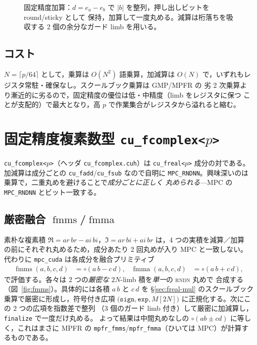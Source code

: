 \documentclass[uplatex,dvipdfmx,a4paper,11pt]{jsarticle}
\newcommand{\code}[1]{\texttt{#1}}
\newcommand{\PB}{\ensuremath{p}}
\newcommand{\Nlimb}{\ensuremath{N}}
\newcommand{\round}{\ensuremath{\circ}}
\newcommand{\rndn}{\textsc{rndn}}
\newcommand{\fmma}{\ensuremath{\operatorname{fmma}}}
\newcommand{\fmms}{\ensuremath{\operatorname{fmms}}}
\begin{document}
\begin{figure}[h]
\centering
{}
\caption{固定精度加算：$d=e_a-e_b$ で $|b|$ を整列，押し出しビットを round/sticky として
保持，加算して一度丸める。減算は桁落ちを吸収する 2 個の余分なガード limb を用いる。}
\label{fig:add}
\end{figure}

\subsection{コスト}
$\Nlimb=\lceil\PB/64\rceil$ として，乗算は $O(\Nlimb^2)$ 語乗算，加減算は
$O(\Nlimb)$ で，いずれもレジスタ常駐・確保なし。スクールブック乗算は GMP/MPFR の
劣 2 次乗算より漸近的に劣るので，固定精度の優位は低・中精度（limb をレジスタに保つ
ことが支配的）で最大となり，高 \PB{} で作業集合がレジスタから溢れると縮む。


\section{固定精度複素数型 \texorpdfstring{\code{cu\_fcomplex<\PB>}}{cu\_fcomplex<PB>}}
\label{sec:fcomplex}

\code{cu\_fcomplex<\PB>}（ヘッダ \code{cu\_fcomplex.cuh}）は \code{cu\_freal<\PB>}
成分の対である。加減算は成分ごとの \code{cu\_fadd}/\code{cu\_fsub} なので自明に
\code{MPC\_RNDNN}。興味深いのは乗算で，二重丸めを避けることで\emph{成分ごとに正しく
丸められる}---MPC の \code{MPC\_RNDNN} とビット一致する。

\subsection{厳密融合 \texorpdfstring{$\fmms$/$\fmma$}{fmms/fmma}}
\label{sec:fmms}

素朴な複素積 $\Re = ar\,br - ai\,bi$，$\Im = ar\,bi + ai\,br$ は，4 つの実積を減算／加算
の前にそれぞれ丸めるため，成分あたり 2 回丸めが入り MPC と一致しない。代わりに
\code{mpc\_cuda} は各成分を融合プリミティブ
\begin{align}
\fmms(a,b,c,d) &= \round(a\,b - c\,d), &
\fmma(a,b,c,d) &= \round(a\,b + c\,d),
\end{align}
で評価する。各々は 2 つの\emph{厳密な} $2\Nlimb$-limb 積を\emph{単一}の \rndn{} 丸めで
合成する（図~\ref{fig:fmms}）。具体的には各積 $a\,b$ と $c\,d$ を \S\ref{sec:freal-mul}
のスクールブック乗算で厳密に形成し，符号付き広項
$\code{(sign},\code{exp},M[2\Nlimb])$ に正規化する。次にこの 2 つの広項を指数差で整列
（3 個のガード limb 付き）して厳密に加減算し，\code{finalize} で一度だけ丸める。
よって結果は中間丸めなしの $\round(ab\pm cd)$ に等しく，これはまさに MPFR の
\code{mpfr\_fmms}/\code{mpfr\_fmma}（ひいては MPC）が計算するものである。
\end{document}
